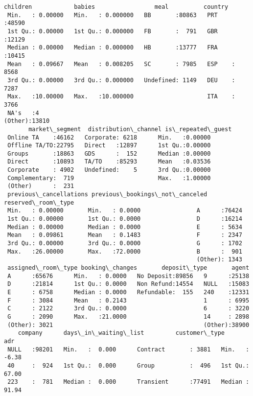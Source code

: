\documentclass[11pt]{article}
\begin{document}
\begin{Verbatim}[commandchars=\\\{\}]
    children            babies                 meal          country     
 Min.   : 0.00000   Min.   : 0.000000   BB       :80863   PRT    :48590  
 1st Qu.: 0.00000   1st Qu.: 0.000000   FB       :  791   GBR    :12129  
 Median : 0.00000   Median : 0.000000   HB       :13777   FRA    :10415  
 Mean   : 0.09667   Mean   : 0.008205   SC       : 7985   ESP    : 8568  
 3rd Qu.: 0.00000   3rd Qu.: 0.000000   Undefined: 1149   DEU    : 7287  
 Max.   :10.00000   Max.   :10.000000                     ITA    : 3766  
 NA's   :4                                                (Other):13810  
       market\_segment  distribution\_channel is\_repeated\_guest
 Online TA    :46162   Corporate: 6218      Min.   :0.00000  
 Offline TA/TO:22795   Direct   :12897      1st Qu.:0.00000  
 Groups       :18863   GDS      :  152      Median :0.00000  
 Direct       :10893   TA/TO    :85293      Mean   :0.03536  
 Corporate    : 4902   Undefined:    5      3rd Qu.:0.00000  
 Complementary:  719                        Max.   :1.00000  
 (Other)      :  231                                         
 previous\_cancellations previous\_bookings\_not\_canceled reserved\_room\_type
 Min.   : 0.00000       Min.   : 0.0000                A      :76424     
 1st Qu.: 0.00000       1st Qu.: 0.0000                D      :16214     
 Median : 0.00000       Median : 0.0000                E      : 5634     
 Mean   : 0.09861       Mean   : 0.1483                F      : 2347     
 3rd Qu.: 0.00000       3rd Qu.: 0.0000                G      : 1702     
 Max.   :26.00000       Max.   :72.0000                B      :  901     
                                                       (Other): 1343     
 assigned\_room\_type booking\_changes       deposit\_type       agent      
 A      :65676      Min.   : 0.0000   No Deposit:89856   9      :25138  
 D      :21814      1st Qu.: 0.0000   Non Refund:14554   NULL   :15083  
 E      : 6758      Median : 0.0000   Refundable:  155   240    :12331  
 F      : 3084      Mean   : 0.2143                      1      : 6995  
 C      : 2122      3rd Qu.: 0.0000                      6      : 3220  
 G      : 2090      Max.   :21.0000                      14     : 2898  
 (Other): 3021                                           (Other):38900  
    company      days\_in\_waiting\_list         customer\_type        adr         
 NULL   :98201   Min.   :  0.000      Contract       : 3881   Min.   :  -6.38  
 40     :  924   1st Qu.:  0.000      Group          :  496   1st Qu.:  67.00  
 223    :  781   Median :  0.000      Transient      :77491   Median :  91.94  

\end{Verbatim}
\end{document}
